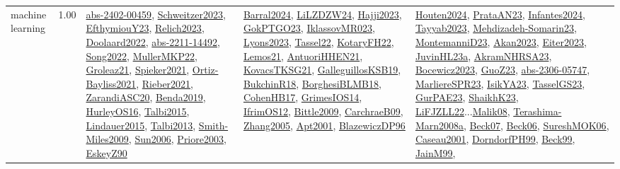 {\begin{longtable}{p{3cm}r>{\raggedright\arraybackslash}p{6cm}>{\raggedright\arraybackslash}p{6cm}>{\raggedright\arraybackslash}p{8cm}}
\index{machine learning}\index{Algorithms!machine learning}machine learning &  1.00 & \hyperref[detail:abs-2402-00459]{abs-2402-00459}, \hyperref[detail:Schweitzer2023]{Schweitzer2023}, \hyperref[detail:EfthymiouY23]{EfthymiouY23}, \hyperref[detail:Relich2023]{Relich2023}, \hyperref[detail:Doolaard2022]{Doolaard2022}, \hyperref[detail:abs-2211-14492]{abs-2211-14492}, \hyperref[detail:Song2022]{Song2022}, \hyperref[detail:MullerMKP22]{MullerMKP22}, \hyperref[detail:Groleaz21]{Groleaz21}, \hyperref[detail:Spieker2021]{Spieker2021}, \hyperref[detail:Ortiz-Bayliss2021]{Ortiz-Bayliss2021}, \hyperref[detail:Rieber2021]{Rieber2021}, \hyperref[detail:ZarandiASC20]{ZarandiASC20}, \hyperref[detail:Benda2019]{Benda2019}, \hyperref[detail:HurleyOS16]{HurleyOS16}, \hyperref[detail:Talbi2015]{Talbi2015}, \hyperref[detail:Lindauer2015]{Lindauer2015}, \hyperref[detail:Talbi2013]{Talbi2013}, \hyperref[detail:Smith-Miles2009]{Smith-Miles2009}, \hyperref[detail:Sun2006]{Sun2006}, \hyperref[detail:Priore2003]{Priore2003}, \hyperref[detail:EskeyZ90]{EskeyZ90} & \hyperref[detail:Barral2024]{Barral2024}, \hyperref[detail:LiLZDZW24]{LiLZDZW24}, \hyperref[detail:Hajji2023]{Hajji2023}, \hyperref[detail:GokPTGO23]{GokPTGO23}, \hyperref[detail:IklassovMR023]{IklassovMR023}, \hyperref[detail:Lyons2023]{Lyons2023}, \hyperref[detail:Tassel22]{Tassel22}, \hyperref[detail:KotaryFH22]{KotaryFH22}, \hyperref[detail:Lemos21]{Lemos21}, \hyperref[detail:AntuoriHHEN21]{AntuoriHHEN21}, \hyperref[detail:KovacsTKSG21]{KovacsTKSG21}, \hyperref[detail:GalleguillosKSB19]{GalleguillosKSB19}, \hyperref[detail:BukchinR18]{BukchinR18}, \hyperref[detail:BorghesiBLMB18]{BorghesiBLMB18}, \hyperref[detail:CohenHB17]{CohenHB17}, \hyperref[detail:GrimesIOS14]{GrimesIOS14}, \hyperref[detail:IfrimOS12]{IfrimOS12}, \hyperref[detail:Bittle2009]{Bittle2009}, \hyperref[detail:CarchraeB09]{CarchraeB09}, \hyperref[detail:Zhang2005]{Zhang2005}, \hyperref[detail:Apt2001]{Apt2001}, \hyperref[detail:BlazewiczDP96]{BlazewiczDP96} & \hyperref[detail:Houten2024]{Houten2024}, \hyperref[detail:PrataAN23]{PrataAN23}, \hyperref[detail:Infantes2024]{Infantes2024}, \hyperref[detail:Tayyab2023]{Tayyab2023}, \hyperref[detail:Mehdizadeh-Somarin23]{Mehdizadeh-Somarin23}, \hyperref[detail:MontemanniD23]{MontemanniD23}, \hyperref[detail:Akan2023]{Akan2023}, \hyperref[detail:Eiter2023]{Eiter2023}, \hyperref[detail:JuvinHL23a]{JuvinHL23a}, \hyperref[detail:AkramNHRSA23]{AkramNHRSA23}, \hyperref[detail:Bocewicz2023]{Bocewicz2023}, \hyperref[detail:GuoZ23]{GuoZ23}, \hyperref[detail:abs-2306-05747]{abs-2306-05747}, \hyperref[detail:MarliereSPR23]{MarliereSPR23}, \hyperref[detail:IsikYA23]{IsikYA23}, \hyperref[detail:TasselGS23]{TasselGS23}, \hyperref[detail:GurPAE23]{GurPAE23}, \hyperref[detail:ShaikhK23]{ShaikhK23}, \hyperref[detail:LiFJZLL22]{LiFJZLL22}...\hyperref[detail:Malik08]{Malik08}, \hyperref[detail:Terashima-Marn2008a]{Terashima-Marn2008a}, \hyperref[detail:Beck07]{Beck07}, \hyperref[detail:Beck06]{Beck06}, \hyperref[detail:SureshMOK06]{SureshMOK06}, \hyperref[detail:Caseau2001]{Caseau2001}, \hyperref[detail:DorndorfPH99]{DorndorfPH99}, \hyperref[detail:Beck99]{Beck99}, \hyperref[detail:JainM99]{JainM99}, 
\end{longtable}}
